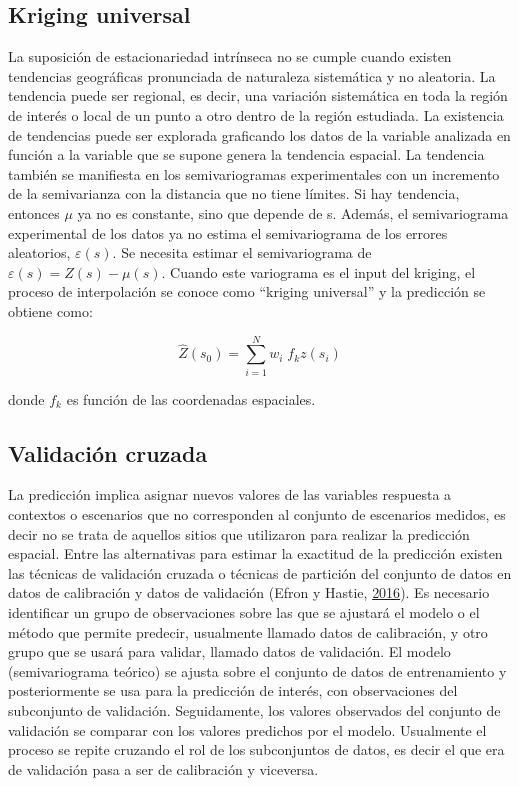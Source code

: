 \documentclass[11pt,b5paper,]{krantz}
\begin{document}
\subsection{Kriging universal}\label{kriging-universal}

La suposición de estacionariedad intrínseca no se cumple cuando existen
tendencias geográficas pronunciada de naturaleza sistemática y no
aleatoria. La tendencia puede ser regional, es decir, una variación
sistemática en toda la región de interés o local de un punto a otro
dentro de la región estudiada. La existencia de tendencias puede ser
explorada graficando los datos de la variable analizada en función a la
variable que se supone genera la tendencia espacial. La tendencia
también se manifiesta en los semivariogramas experimentales con un
incremento de la semivarianza con la distancia que no tiene límites. Si
hay tendencia, entonces \(\mu\) ya no es constante, sino que depende de
s. Además, el semivariograma experimental de los datos ya no estima el
semivariograma de los errores aleatorios, \(\varepsilon(s)\). Se
necesita estimar el semivariograma de
\(\varepsilon(s) = Z (s) - \mu(s)\). Cuando este variograma es el input
del kriging, el proceso de interpolación se conoce como ``kriging
universal'' y la predicción se obtiene como:

\[\hat{Z}(s_0)=\sum_{i=1}^{N}{w_i \; f_kz(s_i)}\]

donde \(f_k\) es función de las coordenadas espaciales.

\subsection{Validación cruzada}\label{validaciuxf3n-cruzada}

La predicción implica asignar nuevos valores de las variables respuesta
a contextos o escenarios que no corresponden al conjunto de escenarios
medidos, es decir no se trata de aquellos sitios que utilizaron para
realizar la predicción espacial. Entre las alternativas para estimar la
exactitud de la predicción existen las técnicas de validación cruzada o
técnicas de partición del conjunto de datos en datos de calibración y
datos de validación (Efron y Hastie,
\protect\hyperlink{ref-Efron_Hastie_2016}{2016}). Es necesario
identificar un grupo de observaciones sobre las que se ajustará el
modelo o el método que permite predecir, usualmente llamado datos de
calibración, y otro grupo que se usará para validar, llamado datos de
validación. El modelo (semivariograma teórico) se ajusta sobre el
conjunto de datos de entrenamiento y posteriormente se usa para la
predicción de interés, con observaciones del subconjunto de validación.
Seguidamente, los valores observados del conjunto de validación se
comparar con los valores predichos por el modelo. Usualmente el proceso
se repite cruzando el rol de los subconjuntos de datos, es decir el que
era de validación pasa a ser de calibración y viceversa.
\end{document}
